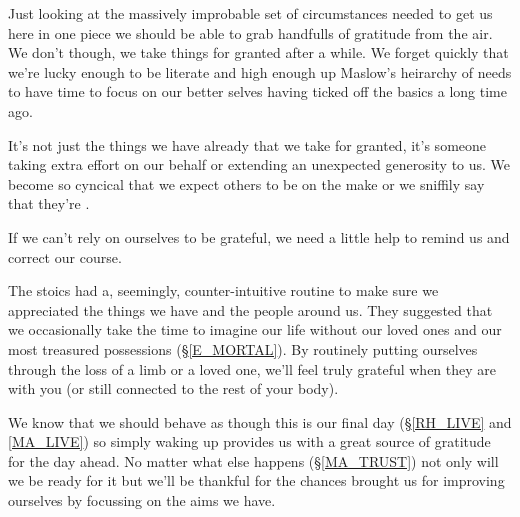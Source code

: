 \cleartorightpage
{\small

Just looking at the massively improbable set of circumstances needed to get us here in one piece we should be able to grab handfulls of gratitude from the air. We don't though, we take things for granted after a while. We forget quickly that we're lucky enough to be literate and high enough up Maslow's heirarchy of needs to have time to focus on our better selves having ticked off the basics a long time ago. 

It's not just the things we have already that we take for granted, it's someone taking extra effort on our behalf or extending an unexpected generosity to us. We become so cyncical that we expect others to be on the make or we sniffily say that they're .

If we can't rely on ourselves to be  grateful, we need a little help to remind us and correct our course.

The stoics had a, seemingly, counter-intuitive routine to make sure we appreciated the things we have and the people around us. They suggested that we occasionally take the time to imagine our life without our loved ones and our most treasured possessions (\S \ref{E_MORTAL}). By routinely putting ourselves through the loss of a limb or a loved one, we'll feel truly grateful when they are with you (or still connected to the rest of your body).

We know that we should behave as though this is our final day (\S \ref{RH_LIVE} and \ref{MA_LIVE}) so simply waking up provides us with a great source of gratitude for the day ahead. No matter what else happens (\S \ref{MA_TRUST}) not only will we be ready for it but we'll be thankful for the chances brought us for improving ourselves by focussing on the aims we have.

}
